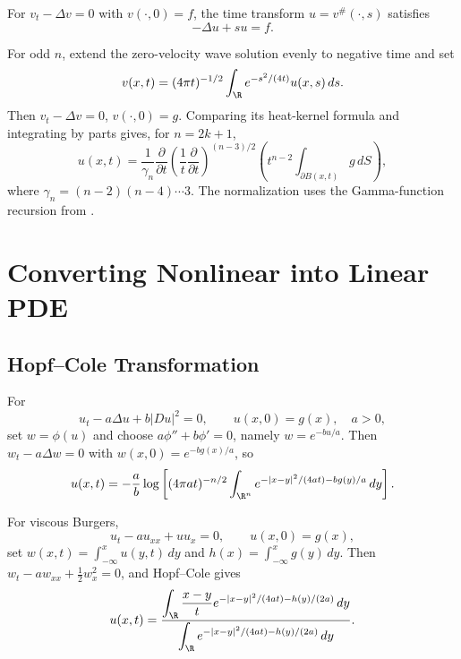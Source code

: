 \begin{example}
\label{ex:resolvent-laplace-transform}
For $v_t-\Delta v=0$ with $v(\cdot,0)=f$, the time transform
$u=v^\#(\cdot,s)$ satisfies
\[
-\Delta u+su=f.
\]
\end{example}

\begin{example}
\label{ex:wave-equation-from-heat-laplace-transform}
For odd $n$, extend the zero-velocity wave solution evenly to negative time and
set
\[
v(x,t)=(4\pi t)^{-1/2}\int_\R e^{-s^2/(4t)}u(x,s)\,ds.
\]
Then $v_t-\Delta v=0$, $v(\cdot,0)=g$. Comparing its heat-kernel formula and
integrating by parts gives, for $n=2k+1$,
\[
u(x,t)=\frac1{\gamma_n}\frac\partial{\partial t}
\left(\frac1t\frac\partial{\partial t}\right)^{(n-3)/2}
\left(t^{n-2}\int_{\partial B(x,t)}g\,dS\right),
\]
where $\gamma_n=(n-2)(n-4)\cdots3$.
The normalization uses the Gamma-function recursion from \cite{Rudin1976}.
\end{example}

\section{Converting Nonlinear into Linear PDE}
\label{sec:converting-nonlinear-into-linear-pde}

\subsection{Hopf--Cole Transformation}
\label{sec:hopf-cole-transformation}

\begin{example}
\label{ex:hopf-cole-quadratic-nonlinearity}
For
\[
u_t-a\Delta u+b|Du|^2=0,\qquad u(x,0)=g(x),\quad a>0,
\]
set $w=\phi(u)$ and choose $a\phi''+b\phi'=0$, namely
$w=e^{-bu/a}$. Then $w_t-a\Delta w=0$ with $w(x,0)=e^{-bg(x)/a}$, so
\[
u(x,t)=-\frac ab\log\left[(4\pi at)^{-n/2}
\int_{\R^n}e^{-|x-y|^2/(4at)-bg(y)/a}\,dy\right].
\]
\end{example}

\begin{example}
\label{ex:viscous-burgers-hopf-cole}
For viscous Burgers,
\[
u_t-au_{xx}+uu_x=0,\qquad u(x,0)=g(x),
\]
set $w(x,t)=\int_{-\infty}^xu(y,t)\,dy$ and
$h(x)=\int_{-\infty}^xg(y)\,dy$. Then
$w_t-aw_{xx}+\frac12w_x^2=0$, and Hopf--Cole gives
\[
u(x,t)=\frac{\displaystyle\int_\R\frac{x-y}{t}
e^{-|x-y|^2/(4at)-h(y)/(2a)}\,dy}
{\displaystyle\int_\R e^{-|x-y|^2/(4at)-h(y)/(2a)}\,dy}.
\]
\end{example}

